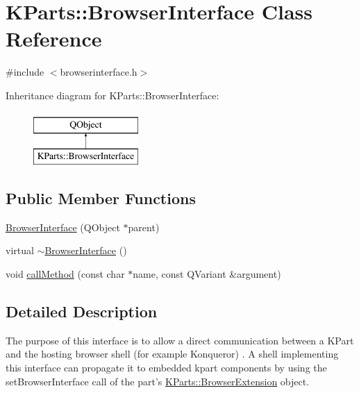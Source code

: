 \hypertarget{classKParts_1_1BrowserInterface}{\section{K\+Parts\+:\+:Browser\+Interface Class Reference}
\label{classKParts_1_1BrowserInterface}
}


{\ttfamily \#include $<$browserinterface.\+h$>$}

Inheritance diagram for K\+Parts\+:\+:Browser\+Interface\+:\begin{figure}[H]
\begin{center}
\leavevmode
\includegraphics[height=2.000000cm]{classKParts_1_1BrowserInterface}
\end{center}
\end{figure}
\subsection*{Public Member Functions}
\begin{DoxyCompactItemize}
\item 
\hyperlink{classKParts_1_1BrowserInterface_a7e7c8ab24a9b90800846028e66eabaed}{Browser\+Interface} (Q\+Object $\ast$parent)
\item 
virtual \hyperlink{classKParts_1_1BrowserInterface_af6f3ca797d626ffd8676a5babb09ad22}{$\sim$\+Browser\+Interface} ()
\item 
void \hyperlink{classKParts_1_1BrowserInterface_a3b2d9e1791a4a6195b53b48180ec761c}{call\+Method} (const char $\ast$name, const Q\+Variant \&argument)
\end{DoxyCompactItemize}


\subsection{Detailed Description}
The purpose of this interface is to allow a direct communication between a K\+Part and the hosting browser shell (for example Konqueror) . A shell implementing this interface can propagate it to embedded kpart components by using the set\+Browser\+Interface call of the part's \hyperlink{classKParts_1_1BrowserExtension}{K\+Parts\+::\+Browser\+Extension} object.


